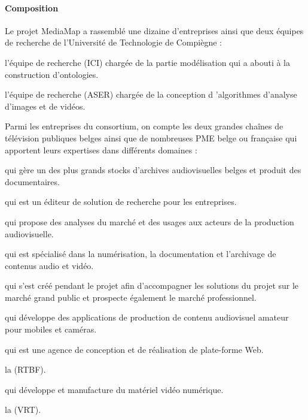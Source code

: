 \paragraph{Composition}
Le projet MediaMap a rassemblé une dizaine d'entreprises ainsi que deux équipes de recherche de l'Université de Technologie de Compiègne :
\begin{liste}
	\item l'équipe de recherche  (ICI) chargée de la partie modélisation qui a abouti à la construction d'ontologies.

	\item l'équipe de recherche  (ASER) chargée de la conception d 'algorithmes d'analyse d'images et de vidéos.
\end{liste}


Parmi les entreprises du consortium, on compte les deux grandes chaînes de télévision publiques belges ainsi que de nombreuses PME belge ou française qui apportent leurs expertises dans différents domaines :
\begin{liste}
	\item {} qui gère un des plus grands stocks d'archives audiovisuelles belges et produit des documentaires.

	\item {} qui est un éditeur de solution de recherche pour les entreprises.

	\item {} qui propose des analyses du marché et des usages aux acteurs de la production audiovisuelle.

	\item {} qui est spécialisé dans la numérisation, la documentation et l'archivage de contenus audio et vidéo.

	\item {} qui s'est créé pendant le projet afin d'accompagner les solutions du projet sur le marché grand public et prospecte également le marché professionnel.

	\item {} qui développe des applications de production de contenu audiovisuel amateur pour mobiles et caméras.

	\item {} qui est une agence de conception et de réalisation de plate-forme Web.

	\item la  (RTBF).

	\item {} qui développe et manufacture du matériel vidéo numérique.

	\item la  (VRT).
\end{liste}









